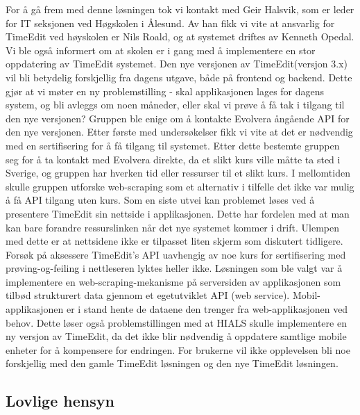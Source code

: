 \documentclass[../main.tex]{subfiles}
\begin{document}
For å gå frem med denne løsningen tok vi kontakt med Geir Halsvik, som er leder for IT seksjonen ved Høgskolen i Ålesund. Av han fikk vi vite at ansvarlig for TimeEdit ved høyskolen er Nils Roald, og at systemet driftes av Kenneth Opedal. Vi ble også informert om at skolen er i gang med å implementere en stor oppdatering av TimeEdit systemet. Den nye versjonen av TimeEdit(versjon 3.x) vil bli betydelig forskjellig fra dagens utgave, både på frontend og backend.\newline
\newline
Dette gjør at vi møter en ny problemstilling - skal applikasjonen lages for dagens system, og bli avleggs om noen måneder, eller skal vi prøve å få tak i tilgang til den nye versjonen? Gruppen ble enige om å kontakte Evolvera ångående API for den nye versjonen. Etter første med undersøkelser fikk vi vite at det er nødvendig med en sertifisering for å få tilgang til systemet. Etter dette bestemte gruppen seg for å ta kontakt med Evolvera direkte, da et slikt kurs ville måtte ta sted i Sverige, og gruppen har hverken tid eller ressurser til et slikt kurs. I mellomtiden skulle gruppen utforske web-scraping som et alternativ i tilfelle det ikke var mulig å få API tilgang uten kurs. Som en siste utvei kan problemet løses ved å presentere TimeEdit sin nettside i applikasjonen. Dette har fordelen med at man kan bare forandre ressurslinken når det nye systemet kommer i drift. Ulempen med dette er at nettsidene ikke er tilpasset liten skjerm som diskutert tidligere.\newline
Forsøk på aksessere TimeEdit’s API uavhengig av noe kurs for sertifisering med prøving-og-feiling i nettleseren lyktes heller ikke.\newline
\newline
Løsningen som ble valgt var å implementere en web-scraping-mekanisme på serversiden av applikasjonen som tilbød strukturert data gjennom et egetutviklet API (web service). Mobil-applikasjonen er i stand hente de dataene den trenger fra web-applikasjonen ved behov. Dette løser også problemstillingen med at HIALS skulle implementere en ny versjon av TimeEdit, da det ikke blir nødvendig å oppdatere samtlige mobile enheter for å kompensere for endringen. For brukerne vil ikke opplevelsen bli noe forskjellig med den gamle TimeEdit løsningen og den nye TimeEdit løsningen.

\subsection{Lovlige hensyn}
\end{document}
